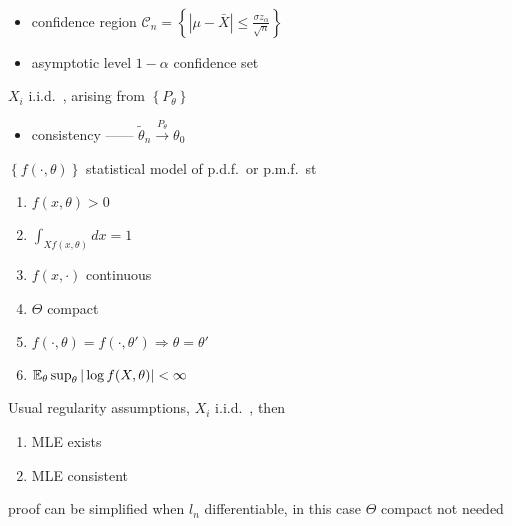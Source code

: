 \begin{example}\,
    \begin{itemize}
        \item confidence region $\mathcal{C}_n = \left\{ |\mu - \bar{X}| \leq \frac{\sigma z_\alpha}{\sqrt{n}} \right\}$
        \item asymptotic level $1 - \alpha$ confidence set
    \end{itemize}
\end{example}

\begin{setting}
    $X_i$ i.i.d.\ , arising from $\left\{ P_\theta \right\}$
\end{setting}

\begin{itemize}
    \item consistency ------ $\tilde \theta_n \xrightarrow{P_\theta} \theta_0$
\end{itemize}

\begin{assumption}
    $\left\{ f(\cdot, \theta) \right\}$ statistical model of p.d.f.\  or p.m.f.\ st
    \begin{enumerate}
        \item $f(x, \theta) > 0$
        \item $\int_{Xf(x, \theta)}dx = 1$
        \item $f(x, \cdot)$ continuous
        \item $\Theta$ compact
        \item $f(\cdot, \theta) = f(\cdot, \theta') \Rightarrow \theta = \theta'$
        \item $\mathbb{E}_{\theta}\sup_{\theta}|\log f(X, \theta)| < \infty$
    \end{enumerate}
\end{assumption}

\begin{thm}
    Usual regularity assumptions, $X_i$ i.i.d.\ , then
    \begin{enumerate}
        \item MLE exists
        \item MLE consistent
    \end{enumerate}
\end{thm}

\begin{fact}
    proof can be simplified when $l_n$ differentiable, in this case $\Theta$ compact not needed
\end{fact}

